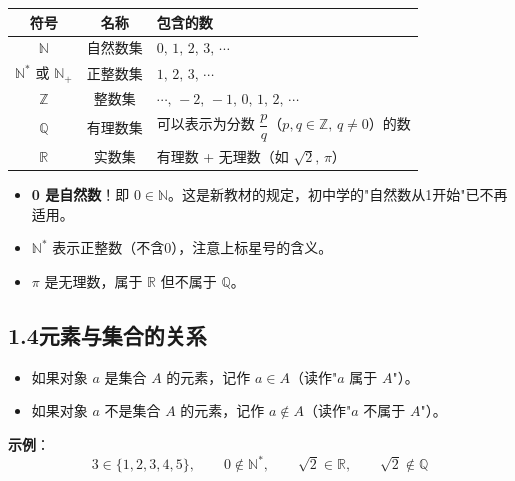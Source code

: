 \documentclass[12pt, a4paper]{ctexart}
\begin{document}
\begin{knowledgebox}[必须牢记的数集记号]
\renewcommand{\arraystretch}{1.4}
\begin{center}
\begin{tabular}{c c l}
\toprule
\textbf{符号} & \textbf{名称} & \textbf{包含的数} \\
\midrule
$\mathbb{N}$ & 自然数集 & $0,\, 1,\, 2,\, 3,\, \cdots$ \\
$\mathbb{N}^*$ 或 $\mathbb{N}_+$ & 正整数集 & $1,\, 2,\, 3,\, \cdots$ \\
$\mathbb{Z}$ & 整数集 & $\cdots,\, -2,\, -1,\, 0,\, 1,\, 2,\, \cdots$ \\
$\mathbb{Q}$ & 有理数集 & 可以表示为分数 $\dfrac{p}{q}$（$p,q\in\mathbb{Z},\, q\neq 0$）的数 \\
$\mathbb{R}$ & 实数集 & 有理数 + 无理数（如 $\sqrt{2},\, \pi$） \\
\bottomrule
\end{tabular}
\end{center}
\end{knowledgebox}

\begin{warnbox}[易错提醒]
\begin{itemize}[leftmargin=2em]
  \item \textbf{0 是自然数}！即 $0 \in \mathbb{N}$。这是新教材的规定，初中学的"自然数从1开始"已不再适用。
  \item $\mathbb{N}^*$ 表示正整数（不含0），注意上标星号的含义。
  \item $\pi$ 是无理数，属于 $\mathbb{R}$ 但不属于 $\mathbb{Q}$。
\end{itemize}
\end{warnbox}

\subsection*{1.4\quad 元素与集合的关系}

\begin{knowledgebox}[属于与不属于]
\begin{itemize}[leftmargin=2em]
  \item 如果对象 $a$ 是集合 $A$ 的元素，记作 $a \in A$（读作"$a$ 属于 $A$"）。
  \item 如果对象 $a$ 不是集合 $A$ 的元素，记作 $a \notin A$（读作"$a$ 不属于 $A$"）。
\end{itemize}

\textbf{示例}：
\[
3 \in \{1,2,3,4,5\}, \qquad
0 \notin \mathbb{N}^*, \qquad
\sqrt{2} \in \mathbb{R}, \qquad
\sqrt{2} \notin \mathbb{Q}
\]
\end{knowledgebox}
\end{document}

